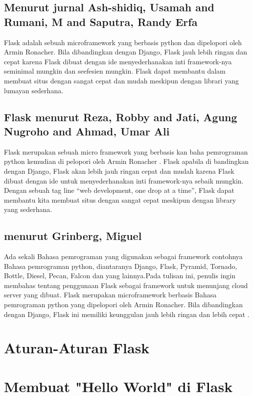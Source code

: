 \documentclass[12pt]{article}
\begin{document}
\subsection{Menurut jurnal Ash-shidiq, Usamah and Rumani, M and Saputra, Randy Erfa}
Flask adalah sebuah microframework yang berbasis python dan dipelopori oleh Armin Ronacher. Bila dibandingkan dengan Django, Flask jauh lebih ringan dan cepat karena Flask dibuat dengan ide menyederhanakan inti framework-nya seminimal mungkin dan seefesien mungkin. Flask dapat membantu dalam membuat situs dengan sangat cepat dan mudah meskipun dengan librari yang lumayan sederhana\cite{ash2017perancangan}.

\subsection{Flask menurut Reza, Robby and Jati, Agung Nugroho and Ahmad, Umar Ali}
Flask merupakan sebuah micro framework yang berbasis kan baha pemrograman python kemudian di pelopori oleh Armin Ronacher . Flask apabila  di bandingkan dengan Django, Flask akan lebih jauh ringan  cepat dan mudah  karena  Flask  dibuat   dengan  ide  untuk menyederhanakan  inti  framework-nya  sebaik  mungkin. Dengan sebuah tag line “web development, one drop at a time”, Flask dapat membantu kita membuat situs dengan sangat cepat meskipun dengan library yang sederhana\cite{reza2016perancangan}.

\subsection{menurut Grinberg, Miguel}
Ada sekali Bahasa pemrograman yang digunakan sebagai framework contohnya Bahasa pemrograman python, diantaranya Django, Flask, Pyramid, Tornado, Bottle, Diesel, Pecan, Falcon dan yang lainnya.Pada tulisan ini, penulis ingin membahas tentang penggunaan Flask sebagai framework untuk menunjang cloud server yang dibuat. Flask merupakan microframework berbasis Bahasa pemrograman python yang dipelopori oleh Armin Ronacher. Bila dibandingkan dengan Django, Flask ini memiliki keunggulan jauh lebih ringan dan lebih cepat \cite{grinberg2018flask}.

\section{Aturan-Aturan Flask}

 
 
\section{Membuat "Hello World" di Flask}
\end{document}
